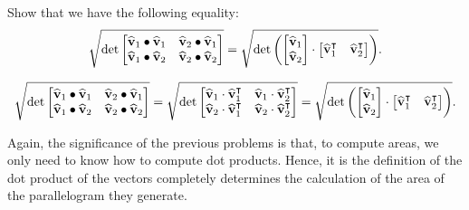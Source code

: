 \documentclass[newpage,hints,handout,nooutcomes,noauthor,12pt]{ximera}
\begin{document}
\begin{problem}
Show that we have the following equality:
\[
\sqrt{
  \det
\begin{bmatrix}
\hat{\mathbf v}_{1}\bullet\hat{\mathbf v}_{1} & \hat{\mathbf v}_{2}\bullet\hat{\mathbf v}_{1}\\
\hat{\mathbf v}_{1}\bullet\hat{\mathbf v}_{2} & \hat{\mathbf v}_{2}\bullet\hat{\mathbf v}_{2}%
\end{bmatrix}}
=
\sqrt{
  \det\left(
\begin{bmatrix}
\hat{\mathbf v}_{1} \\
\hat{\mathbf v}_{2}
\end{bmatrix}
\cdot
\begin{bmatrix}
\hat{\mathbf v}_{1}^\transpose  & \hat{\mathbf v}_{2}^\transpose 
\end{bmatrix}\right)}.
\]

\begin{freeResponse}
\[
\sqrt{
  \det
\begin{bmatrix}
\hat{\mathbf v}_{1}\bullet\hat{\mathbf v}_{1} & \hat{\mathbf v}_{2}\bullet\hat{\mathbf v}_{1}\\
\hat{\mathbf v}_{1}\bullet\hat{\mathbf v}_{2} & \hat{\mathbf v}_{2}\bullet\hat{\mathbf v}_{2}%
\end{bmatrix}}
=\sqrt{
  \det
\begin{bmatrix}
\hat{\mathbf v}_{1}\cdot \hat{\mathbf v}_{1}^\transpose & \hat{\mathbf v}_{1}\cdot \hat{\mathbf v}_{2}^\transpose\\
\hat{\mathbf v}_{2}\cdot \hat{\mathbf v}_{1}^\transpose & \hat{\mathbf v}_{2}\cdot \hat{\mathbf v}_{2}^\transpose%
\end{bmatrix}}
=\sqrt{
  \det\left(
\begin{bmatrix}
\hat{\mathbf v}_{1} \\
\hat{\mathbf v}_{2}
\end{bmatrix}
\cdot
\begin{bmatrix}
\hat{\mathbf v}_{1}^\transpose  & \hat{\mathbf v}_{2}^\transpose 
\end{bmatrix}\right)}.
\]
\end{freeResponse}
\end{problem}

Again, the significance of the previous problems is that, to compute
areas, we only need to know how to compute dot products. Hence, it is
the definition of the dot product of the vectors completely determines
the calculation of the area of the parallelogram they generate.
\end{document}
